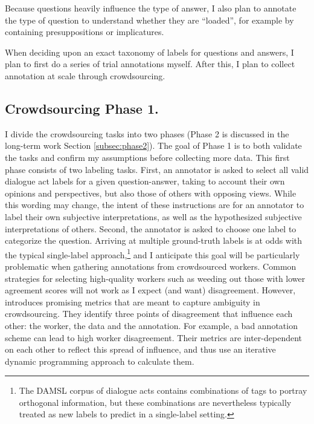 Because questions heavily influence the type of answer, I also plan to annotate the type of question to understand whether they are ``loaded'', for example by containing presuppositions or implicatures. 


When deciding upon an exact taxonomy of labels for questions and answers, I plan to first do a series of trial annotations myself. After this, I  plan to collect annotation at scale through crowdsourcing. 

\subsection{Crowdsourcing Phase 1.}
I divide the crowdsourcing tasks into two phases (Phase 2 is discussed in the long-term work Section \ref{subsec:phase2}). The goal of Phase 1 is to both validate the tasks and confirm my assumptions before collecting more data. This first phase consists of two labeling tasks. First, an annotator is asked to select all valid dialogue act labels for a given question-answer, taking to account their own opinions and perspectives, but also those of others with opposing views. While this wording may change, the intent of these instructions are for an annotator to label their own subjective interpretations, as well as the hypothesized subjective interpretations of others. Second, the annotator is asked to choose one label to categorize the question. Arriving at multiple ground-truth labels is at odds with the typical single-label approach,\footnote{The DAMSL corpus of dialogue acts contains combinations of tags to portray orthogonal information, but these combinations are nevertheless typically treated as new labels to predict in a single-label setting.} and I anticipate this goal will be particularly problematic when gathering annotations from crowdsourced workers. Common strategies for selecting high-quality workers such as weeding out those with lower agreement scores will not work as I expect (and want) disagreement. However, \citet{Dumitrache:2018} introduces promising metrics that are meant to capture ambiguity in crowdsourcing. They identify three points of disagreement that influence each other: the worker, the data and the annotation. For example, a bad annotation scheme can lead to high worker disagreement. Their metrics are inter-dependent on each other to reflect this spread of influence, and thus use an iterative dynamic programming approach to calculate them.

